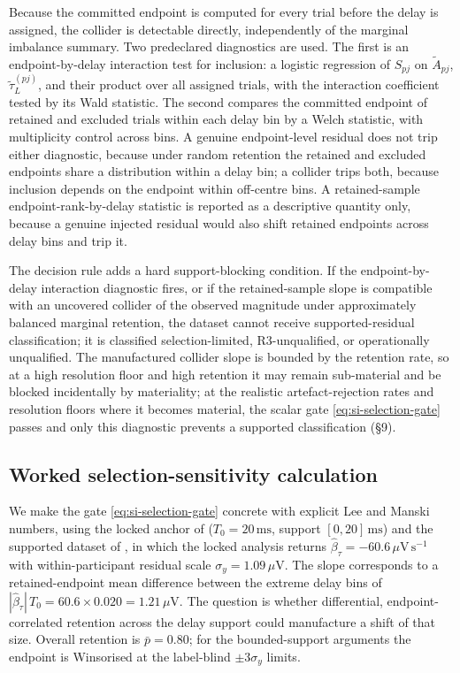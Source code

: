 \documentclass[11pt,a4paper]{article}
\theoremstyle{definition}
\begin{document}
Because the committed endpoint is computed for every trial before the delay is
assigned, the collider is detectable directly, independently of the marginal
imbalance summary. Two predeclared diagnostics are used. The first is an
endpoint-by-delay interaction test for inclusion: a logistic regression of
\(S_{pj}\) on \(\tilde A_{pj}\), \(\tilde\tau^{(pj)}_L\), and their product over all
assigned trials, with the interaction coefficient tested by its Wald statistic. The
second compares the committed endpoint of retained and excluded trials within each
delay bin by a Welch statistic, with multiplicity control across bins. A genuine
endpoint-level residual does not trip either diagnostic, because under random
retention the retained and excluded endpoints share a distribution within a delay
bin; a collider trips both, because inclusion depends on the endpoint within
off-centre bins. A retained-sample endpoint-rank-by-delay statistic is reported as
a descriptive quantity only, because a genuine injected residual would also shift
retained endpoints across delay bins and trip it.

The decision rule adds a hard support-blocking condition. If the endpoint-by-delay
interaction diagnostic fires, or if the retained-sample slope is compatible with an
uncovered collider of the observed magnitude under approximately balanced marginal
retention, the dataset cannot receive supported-residual classification; it is
classified selection-limited, R3-unqualified, or operationally unqualified. The
manufactured collider slope is bounded by the retention rate, so at a high resolution
floor and high retention it may remain sub-material and be blocked incidentally by
materiality; at the realistic artefact-rejection rates and resolution floors where it
becomes material, the scalar gate \eqref{eq:si-selection-gate} passes and only this
diagnostic prevents a supported classification (\S9).

\subsection{Worked selection-sensitivity calculation}
\label{sec:si-selection-worked}

We make the gate \eqref{eq:si-selection-gate} concrete with explicit Lee and
Manski numbers, using the locked anchor of 
(\(T_0=20\,\mathrm{ms}\), support \([0,20]\,\mathrm{ms}\)) and the supported
dataset of , in which the locked analysis returns
\(\widehat{\beta}_\tau=-60.6\,\mu\mathrm{V\,s^{-1}}\) with within-participant
residual scale \(\sigma_y=1.09\,\mu\mathrm{V}\). The slope corresponds to a
retained-endpoint mean difference between the extreme delay bins of
\(|\widehat{\beta}_\tau|\,T_0=60.6\times0.020=1.21\,\mu\mathrm{V}\). The
question is whether differential, endpoint-correlated retention across the delay
support could manufacture a shift of that size. Overall retention is
\(\bar p=0.80\); for the bounded-support arguments the endpoint is Winsorised at
the label-blind \(\pm3\sigma_y\) limits.
\end{document}
